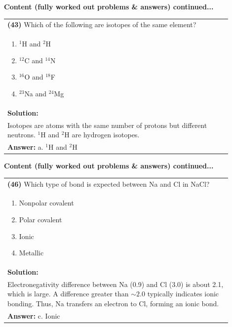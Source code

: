 \documentclass{article}
\begin{document}
\noindent
{\large\textbf{Content (fully worked out problems \& answers) continued...}}\\[0.2em]
\vspace{0.2cm}
\begin{tabular}{|p{0.9\linewidth}|}
\hline
\vspace{0.2cm}
\textbf{(43)} Which of the following are isotopes of the same element? \\
\begin{minipage}[t]{0.85\linewidth}
\begin{enumerate}[label=\alph*.]
\item $^{1}$H and $^{2}$H \
\item $^{12}$C and $^{14}$N \
\item $^{16}$O and $^{18}$F \
\item $^{23}$Na and $^{24}$Mg
\end{enumerate}
\end{minipage}\\
\hline
\vspace{0.2cm}
\textbf{Solution:} \\
Isotopes are atoms with the same number of protons but different neutrons. $^{1}$H and $^{2}$H are hydrogen isotopes. \\
\hline
\vspace{0.2cm}
\textbf{Answer:} a. $^{1}$H and $^{2}$H \\
\hline
\end{tabular}

\newpage

\noindent
{\large\textbf{Content (fully worked out problems \& answers) continued...}}\\[0.2em]
\vspace{0.2cm}
\begin{tabular}{|p{0.9\linewidth}|}
\hline
\vspace{0.2cm}
\textbf{(46)} Which type of bond is expected between Na and Cl in NaCl? \\
\begin{minipage}[t]{0.85\linewidth}
\begin{enumerate}[label=\alph*.]
\item Nonpolar covalent \
\item Polar covalent \
\item Ionic \
\item Metallic
\end{enumerate}
\end{minipage}\\
\hline
\vspace{0.2cm}
\textbf{Solution:} \\
Electronegativity difference between Na (0.9) and Cl (3.0) is about 2.1, which is large. A difference greater than $\sim 2.0$ typically indicates ionic bonding. Thus, Na transfers an electron to Cl, forming an ionic bond. \\
\hline
\vspace{0.2cm}
\textbf{Answer:} c. Ionic \\
\hline
\end{tabular}
\newpage
\end{document}
